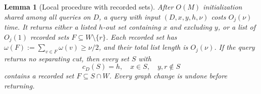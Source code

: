 \documentclass[11pt]{article}
\newtheorem{lemma}[theorem]{Lemma}
\theoremstyle{definition}
\theoremstyle{remark}
\newcommand{\wt}{\omega}
\begin{document}
\begin{lemma}[Local procedure with recorded sets]
\label{lem:recorded}
After \(O(M)\) initialization shared among all queries on \(D\), a query with input \((D,x,y,h,\nu)\) costs \(O_j(\nu)\) time. It returns either a listed \(h\)-out set containing \(x\) and excluding \(y\), or a list of \(O_j(1)\) recorded sets \(F\subseteq W\setminus\{r\}\). Each recorded set has \(\wt(F):=\sum_{v\in F}\wt(v)\ge\nu/2\), and their total list length is \(O_j(\nu)\). If the query returns no separating cut, then every set \(S\) with
\begin{equation}
 c_D(S)=h,\quad x\in S,\quad y,r\notin S
 \label{eq:recorded-target}
\end{equation}
contains a recorded set \(F\subseteq S\cap W\). Every graph change is undone before returning.
\end{lemma}
\end{document}
